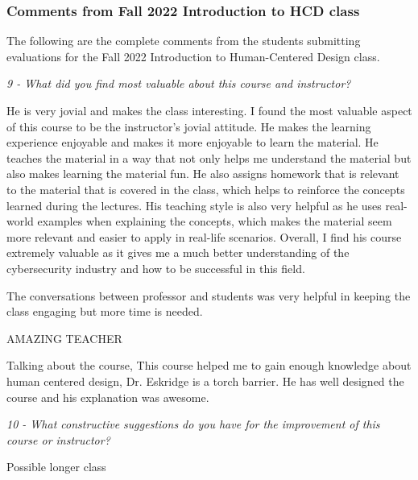 \documentclass[12pt,letterpaper]{report}
\begin{document}
\subsubsection*{Comments from Fall 2022 Introduction to HCD class}
The following are the complete comments from the students submitting evaluations for the Fall 2022 Introduction to Human-Centered Design class.

\textit{9 - What did you find most valuable about this course and instructor?}
{\selectfont
\begin{tablist}
\item \tab{}He is very jovial and makes the class interesting. I found the most valuable aspect of this course to be the instructor's jovial attitude. He makes the learning experience enjoyable and makes it more enjoyable to learn the material. He teaches the material in a way that not only helps me understand the material but also makes learning the material fun. He also assigns homework that is relevant to the material that is covered in the class, which helps to reinforce the concepts learned during the lectures. His teaching style is also very helpful as he uses real-world examples when explaining the concepts, which makes the material seem more relevant and easier to apply in real-life scenarios. Overall, I find his course extremely valuable as it gives me a much better understanding of the cybersecurity industry and how to be successful in this field.
\item \tab{}The conversations between professor and students was very helpful in keeping the class engaging but more time is needed. 
\item \tab{}AMAZING TEACHER
\item \tab{}Talking about the course, This course helped me to gain enough knowledge about human centered design, Dr. Eskridge is a torch barrier. He has well designed the course and his explanation was awesome.
\end{tablist}
}
\textit{10 - What constructive suggestions do you have for the improvement of this course or instructor?}
{\selectfont
\begin{tablist}
\item \tab{}Possible longer class
\end{tablist}
}
\end{document}

